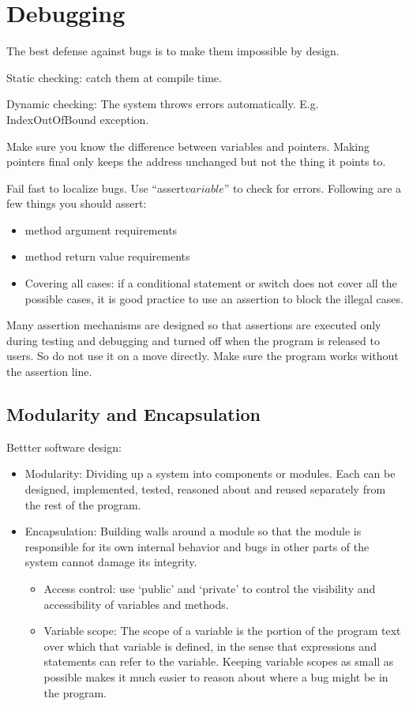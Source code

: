 \documentclass[letterpaper,12pt]{article}
\begin{document}
\section{Debugging}

The best defense against bugs is to make them impossible by design.

Static checking: catch them at compile time.

Dynamic checking: The system throws errors automatically. E.g. IndexOutOfBound
exception.

Make sure you know the difference between variables and pointers. Making
pointers final only keeps the address unchanged but not the thing it points to.

Fail fast to localize bugs. Use ``assert\(variable\)'' to check for errors.
Following are a few things you should assert:
\begin{itemize}
      \item method argument requirements
      \item method return value requirements
      \item Covering all cases: if a conditional statement or switch does not cover all the
            possible cases, it is good practice to use an assertion to block the illegal
            cases.
\end{itemize}

Many assertion mechanisms are designed so that assertions are executed only
during testing and debugging and turned off when the program is released to
users. So do not use it on a move directly. Make sure the program works without
the assertion line.

\subsection{Modularity and Encapsulation}
Bettter software design:
\begin{itemize}
      \item Modularity: Dividing up a system into components or modules. Each can be
            designed, implemented, tested, reasoned about and reused separately from the
            rest of the program.
      \item Encapsulation: Building walls around a module so that the module is responsible for
            its own internal behavior and bugs in other parts of the system cannot damage
            its integrity.
            \begin{itemize}
                  \item Access control: use `public' and `private' to control the visibility and
                        accessibility of variables and methods.
                  \item Variable scope: The scope of a variable is the portion of the program text over
                        which that variable is defined, in the sense that expressions and statements
                        can refer to the variable. Keeping variable scopes as small as possible makes
                        it much easier to reason about where a bug might be in the program.
            \end{itemize}
\end{itemize}
\end{document}
